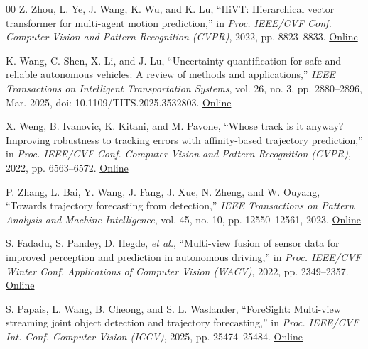 \documentclass[lettersize,journal]{IEEEtran}
\begin{document}
\begin{thebibliography}{00}
 Z. Zhou, L. Ye, J. Wang, K. Wu, and K. Lu, ``HiVT: Hierarchical vector transformer for multi-agent motion prediction,'' in \textit{Proc. IEEE/CVF Conf. Computer Vision and Pattern Recognition (CVPR)}, 2022, pp. 8823--8833. \href{https://openaccess.thecvf.com/content/CVPR2022/html/Zhou_HiVT_Hierarchical_Vector_Transformer_for_Multi-Agent_Motion_Prediction_CVPR_2022_paper.html}{Online}

 K. Wang, C. Shen, X. Li, and J. Lu, ``Uncertainty quantification for safe and reliable autonomous vehicles: A review of methods and applications,'' \textit{IEEE Transactions on Intelligent Transportation Systems}, vol. 26, no. 3, pp. 2880--2896, Mar. 2025, doi: 10.1109/TITS.2025.3532803. \href{https://doi.org/10.1109/TITS.2025.3532803}{Online}

 X. Weng, B. Ivanovic, K. Kitani, and M. Pavone, ``Whose track is it anyway? Improving robustness to tracking errors with affinity-based trajectory prediction,'' in \textit{Proc. IEEE/CVF Conf. Computer Vision and Pattern Recognition (CVPR)}, 2022, pp. 6563--6572. \href{https://openaccess.thecvf.com/content/CVPR2022/html/Weng_Whose_Track_Is_It_Anyway_Improving_Robustness_to_Tracking_Errors_CVPR_2022_paper.html}{Online}

 P. Zhang, L. Bai, Y. Wang, J. Fang, J. Xue, N. Zheng, and W. Ouyang, ``Towards trajectory forecasting from detection,'' \textit{IEEE Transactions on Pattern Analysis and Machine Intelligence}, vol. 45, no. 10, pp. 12550--12561, 2023. \href{https://doi.org/10.1109/TPAMI.2023.3274686}{Online}

 S. Fadadu, S. Pandey, D. Hegde, \textit{et al.}, ``Multi-view fusion of sensor data for improved perception and prediction in autonomous driving,'' in \textit{Proc. IEEE/CVF Winter Conf. Applications of Computer Vision (WACV)}, 2022, pp. 2349--2357. \href{https://openaccess.thecvf.com/content/WACV2022/html/Fadadu_Multi-View_Fusion_of_Sensor_Data_for_Improved_Perception_and_Prediction_WACV_2022_paper.html}{Online}

 S. Papais, L. Wang, B. Cheong, and S. L. Waslander, ``ForeSight: Multi-view streaming joint object detection and trajectory forecasting,'' in \textit{Proc. IEEE/CVF Int. Conf. Computer Vision (ICCV)}, 2025, pp. 25474--25484. \href{https://openaccess.thecvf.com/content/ICCV2025/html/Papais_ForeSight_Multi-View_Streaming_Joint_Object_Detection_and_Trajectory_Forecasting_ICCV_2025_paper.html}{Online}


\end{thebibliography}
\end{document}
